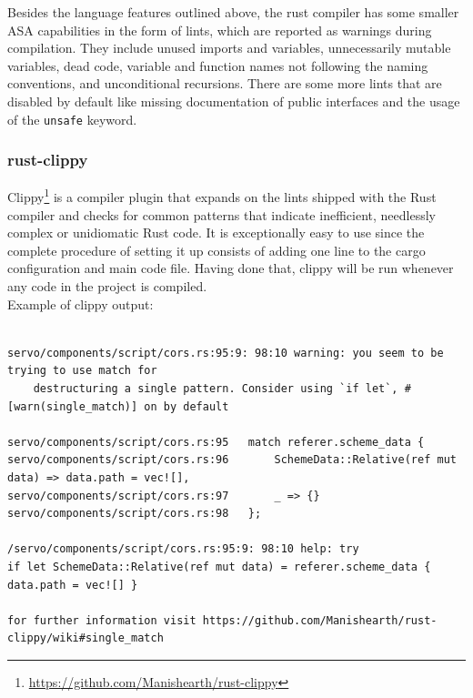 \documentclass{scrartcl}
\begin{document}
Besides the language features outlined above, the rust compiler has some smaller ASA capabilities in the form of lints, which are reported as warnings during compilation. They include unused imports and variables, unnecessarily mutable variables, dead code, variable and function names not following the naming conventions, and unconditional recursions. There are some more lints that are disabled by default like missing documentation of public interfaces and the usage of the \texttt{unsafe} keyword.

\subsubsection{rust-clippy} \label{clippy}

Clippy\footnote{\url{https://github.com/Manishearth/rust-clippy}} is a compiler plugin that expands on the lints shipped with the Rust compiler and checks for common patterns that indicate inefficient, needlessly complex or unidiomatic Rust code. It is exceptionally easy to use since the complete procedure of setting it up consists of adding one line to the cargo configuration and main code file. Having done that, clippy will be run whenever any code in the project is compiled.\\
\newpage
Example of clippy output:
{
\scriptsize
\begin{verbatim}

servo/components/script/cors.rs:95:9: 98:10 warning: you seem to be trying to use match for
    destructuring a single pattern. Consider using `if let`, #[warn(single_match)] on by default
    
servo/components/script/cors.rs:95   match referer.scheme_data {
servo/components/script/cors.rs:96       SchemeData::Relative(ref mut data) => data.path = vec![],
servo/components/script/cors.rs:97       _ => {}
servo/components/script/cors.rs:98   };

/servo/components/script/cors.rs:95:9: 98:10 help: try
if let SchemeData::Relative(ref mut data) = referer.scheme_data { data.path = vec![] }

for further information visit https://github.com/Manishearth/rust-clippy/wiki#single_match

\end{verbatim}
}
\end{document}
